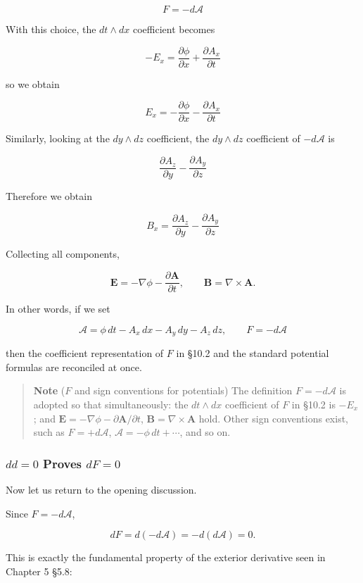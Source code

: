 \[
F=-d\mathcal{A}
\]

With this choice, the \(dt\wedge dx\) coefficient becomes

\[
-E_x
=
\frac{\partial\phi}{\partial x}
+
\frac{\partial A_x}{\partial t}
\]

so we obtain

\[
E_x
=
-\frac{\partial\phi}{\partial x}
-
\frac{\partial A_x}{\partial t}
\]

Similarly, looking at the \(dy\wedge dz\) coefficient, the
\(dy\wedge dz\) coefficient of \(-d\mathcal{A}\) is

\[
\frac{\partial A_z}{\partial y}
-
\frac{\partial A_y}{\partial z}
\]

Therefore we obtain

\[
B_x
=
\frac{\partial A_z}{\partial y}
-
\frac{\partial A_y}{\partial z}
\]

Collecting all components,

\[
\mathbf{E}
=
-\nabla\phi
-
\frac{\partial\mathbf{A}}{\partial t},
\qquad
\mathbf{B}
=
\nabla\times\mathbf{A}.
\]

In other words, if we set

\[
\mathcal{A}
=
\phi\,dt
-
A_x\,dx
-
A_y\,dy
-
A_z\,dz,
\qquad
F=-d\mathcal{A}
\]

then the coefficient representation of \(F\) in §10.2 and the standard
potential formulas are reconciled at once.

\begin{quote}
\textbf{Note} (\(F\) and sign conventions for potentials) The definition
\(F=-d\mathcal{A}\) is adopted so that simultaneously: the
\(dt\wedge dx\) coefficient of \(F\) in §10.2 is \(-E_x\); and
\(\mathbf{E}=-\nabla\phi-\partial\mathbf{A}/\partial t\),
\(\mathbf{B}=\nabla\times\mathbf{A}\) hold. Other sign conventions
exist, such as \(F=+d\mathcal{A}\), \(\mathcal{A}=-\phi\,dt+\cdots\),
and so on.
\end{quote}

\hypertarget{dd0-proves-df0}{%
\subsubsection{\texorpdfstring{\(dd=0\) Proves
\(dF=0\)}{dd=0 Proves dF=0}}\label{dd0-proves-df0}}

Now let us return to the opening discussion.

Since \(F=-d\mathcal{A}\),

\[
dF
=
d(-d\mathcal{A})
=
-d(d\mathcal{A})
=
0.
\]

This is exactly the fundamental property of the exterior derivative seen
in Chapter 5 §5.8:

